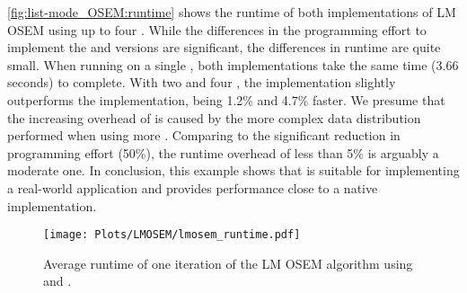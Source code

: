 \autoref{fig:list-mode_OSEM:runtime} shows the runtime of both implementations of LM OSEM using up to four \GPUs.
While the differences in the programming effort to implement the \SkelCL and \OpenCL versions are significant, the differences in runtime are quite small.
When running on a single \GPU, both implementations take the same time (3.66 seconds) to complete.
With two and four \GPUs, the \OpenCL implementation slightly outperforms the \SkelCL implementation, being 1.2\% and 4.7\% faster.
We presume that the increasing overhead of \SkelCL is caused by the more complex data distribution performed when using more \GPUs.
Comparing to the significant reduction in programming effort (50\%), the runtime overhead of less than 5\% is arguably a moderate one.
In conclusion, this example shows that \SkelCL is suitable for implementing a real-world application and provides performance close to a native \OpenCL implementation.

\begin{figure}
  \centering
  \texttt{[image: Plots/LMOSEM/lmosem\_runtime.pdf]}
  \caption[Average runtime of one iteration of the LM OSEM algorithm.]%
          {Average runtime of one iteration of the LM OSEM algorithm using \OpenCL and \SkelCL.}
  \label{fig:list-mode_OSEM:runtime}
\end{figure}


